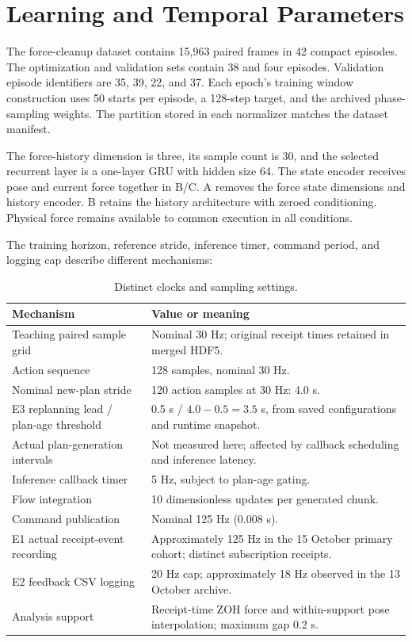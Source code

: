 \section{Learning and Temporal Parameters}
The force-cleanup dataset contains 15,963 paired frames in 42 compact episodes. The optimization and validation sets contain 38 and four episodes. Validation episode identifiers are 35, 39, 22, and 37. Each epoch's training window construction uses 50 starts per episode, a 128-step target, and the archived phase-sampling weights. The partition stored in each normalizer matches the dataset manifest.

The force-history dimension is three, its sample count is 30, and the selected recurrent layer is a one-layer GRU with hidden size 64. The state encoder receives pose and current force together in B/C. A removes the force state dimensions and history encoder. B retains the history architecture with zeroed conditioning. Physical force remains available to common execution in all conditions.

The training horizon, reference stride, inference timer, command period, and logging cap describe different mechanisms:
\begin{table}[tbp]\centering\small
\caption[Distinct clocks and sampling settings]{Distinct clocks and sampling settings.}
\label{tab:clock_definitions}
\begin{tabularx}{\textwidth}{P{0.39\textwidth}X}
\toprule Mechanism & Value or meaning \\ \midrule
Teaching paired sample grid & Nominal 30 Hz; original receipt times retained in merged HDF5. \\
Action sequence & 128 samples, nominal 30 Hz. \\
Nominal new-plan stride & 120 action samples at 30 Hz: 4.0 s. \\
E3 replanning lead / plan-age threshold & 0.5 s / \(4.0-0.5=3.5\) s, from saved configurations and runtime snapshot. \\
Actual plan-generation intervals & Not measured here; affected by callback scheduling and inference latency. \\
Inference callback timer & 5 Hz, subject to plan-age gating. \\
Flow integration & 10 dimensionless updates per generated chunk. \\
Command publication & Nominal 125 Hz (0.008 s). \\
E1 actual receipt-event recording & Approximately 125 Hz in the 15 October primary cohort; distinct subscription receipts. \\
E2 feedback CSV logging & 20 Hz cap; approximately 18 Hz observed in the 13 October archive. \\
Analysis support & Receipt-time ZOH force and within-support pose interpolation; maximum gap 0.2 s. \\
\bottomrule
\end{tabularx}
\end{table}

